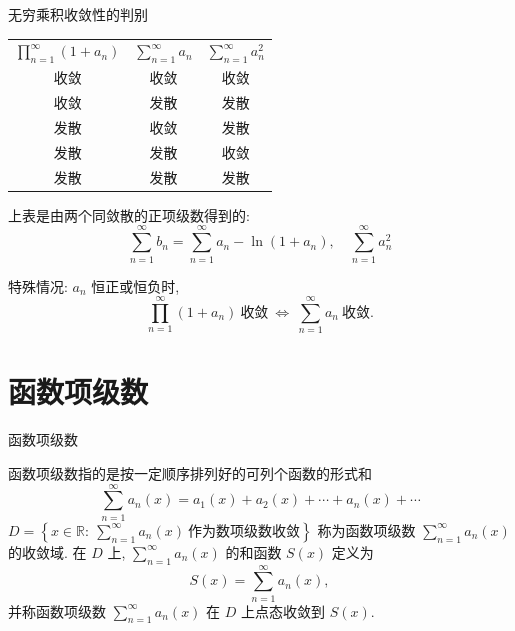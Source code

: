 
\begin{frame}{无穷乘积收敛性的判别}

\begin{table}
\centering
\begin{tabular}{ccc}
$\prod\limits_{n=1}^\infty (1 + a_n)$ & $\sum\limits_{n=1}^\infty a_n$ & $\sum\limits_{n=1}^\infty a_n^2$ \\
{\color{cyan}收敛} & {\color{cyan}收敛} & {\color{cyan}收敛} \\
{\color{cyan}收敛} & {\color{red}发散} & {\color{red}发散} \\
{\color{red}发散} & {\color{cyan}收敛} & {\color{red}发散} \\
{\color{red}发散} & {\color{red}发散} & {\color{cyan}收敛} \\
{\color{red}发散} & {\color{red}发散} & {\color{red}发散}
\end{tabular}
\end{table}

\pause

上表是由两个同敛散的正项级数得到的:
\[\sum\limits_{n=1}^{\infty} b_n = \sum\limits_{n=1}^{\infty} a_n - \ln (1 + a_n), \quad \sum\limits_{n=1}^{\infty} a_n^2\]

\pause

特殊情况: $a_n$ 恒正或恒负时,
\[\prod\limits_{n=1}^\infty (1 + a_n) ~ \text{收敛} ~ \Longleftrightarrow ~ \sum\limits_{n=1}^\infty a_n ~ \text{收敛}.\]

\end{frame}


\section{函数项级数}


\begin{frame}{函数项级数}

\begin{Def}
函数项级数指的是{\color{red}按一定顺序排列好}的可列个函数的形式和
\[\sum\limits_{n=1}^\infty a_n(x) = a_1(x) + a_2(x) + \cdots + a_n(x) + \cdots\]
\pause
$D = \left\{x \in \mathbb{R}: ~ \sum\limits_{n=1}^\infty a_n(x) ~ \text{作为数项级数收敛}\right\}$ 称为函数项级数 $\sum\limits_{n=1}^\infty a_n(x)$ 的收敛域.
在 $D$ 上, $\sum\limits_{n=1}^\infty a_n(x)$ 的和函数 $S(x)$ 定义为
\[S(x) = \sum\limits_{n=1}^\infty a_n(x),\]
并称函数项级数 $\sum\limits_{n=1}^\infty a_n(x)$ 在 $D$ 上点态收敛到 $S(x).$
\end{Def}

\end{frame}


